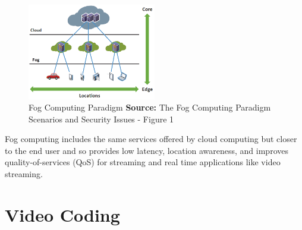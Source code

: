 \begin{figure}[!h]
\centering
\includegraphics[width=0.5\textwidth]{images/fog}
\caption[Fog Computing Paradigm]{Fog Computing Paradigm
\textbf{Source:} The Fog Computing Paradigm Scenarios and Security Issues - Figure 1}
\label{fog}
\end{figure}

Fog computing includes the same services offered by cloud computing but closer to the end user and so provides low latency, location awareness, and improves quality-of-services (QoS) for streaming and real time applications like video streaming.

\section{Video Coding}





